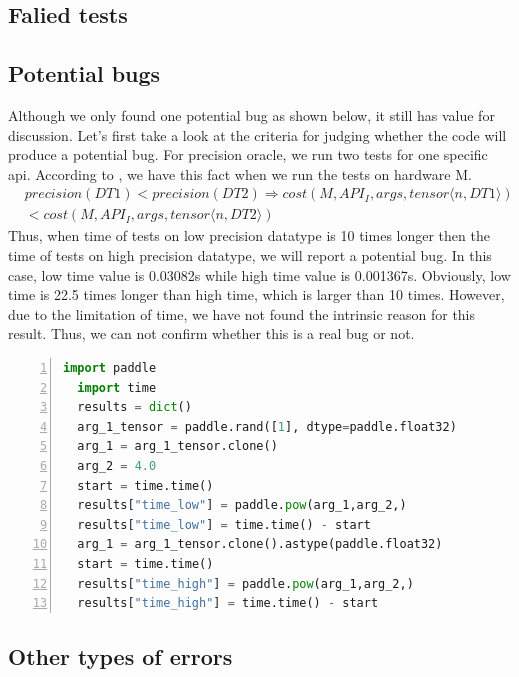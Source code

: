 \documentclass[sigconf]{acmart}
\begin{document}
  \subsection{Falied tests}
  \subsection{Potential bugs}
  Although we only found one potential bug as shown below, it still has value for discussion.
  Let's first take a look at the criteria for judging whether the code will produce a potential bug.
  For precision oracle, we run two tests for one specific api. According to \cite{w1}, we have this fact when 
  we run the tests on hardware M.
  \begin{equation}
    \begin{aligned}
      & precision(DT1) < precision(DT2) \Rightarrow cost(M, API_I, args, tensor \langle n, DT1 \rangle) \\
      & < cost(M, API_I, args, tensor \langle n, DT2 \rangle)
    \end{aligned}
  \end{equation}
  Thus, when time of tests on low precision datatype is 10 times longer then the time of tests on high precision datatype, we will report a potential bug. 
  In this case, low time value is 0.03082s while high time value is 0.001367s. Obviously, low time is 22.5 times longer than high time, which is larger than 10 times.
  However, due to the limitation of time, we have not found the intrinsic reason for this result. Thus, we can not confirm whether this is a real bug or not.
    
  
  \begin{lstlisting}[language=Python, numbers=left, caption={Potential bug when excuting precision oracle}, label={lst:potential_bug}]
  import paddle
  import time
  results = dict()
  arg_1_tensor = paddle.rand([1], dtype=paddle.float32)
  arg_1 = arg_1_tensor.clone()
  arg_2 = 4.0
  start = time.time()
  results["time_low"] = paddle.pow(arg_1,arg_2,)
  results["time_low"] = time.time() - start
  arg_1 = arg_1_tensor.clone().astype(paddle.float32)
  start = time.time()
  results["time_high"] = paddle.pow(arg_1,arg_2,)
  results["time_high"] = time.time() - start
\end{lstlisting}




  \subsection{Other types of errors}
\end{document}
